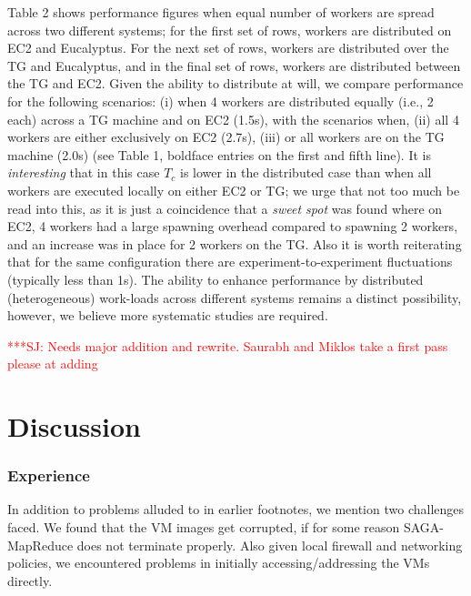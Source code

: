 \documentclass[3p,twocolumn]{elsarticle}
\newcommand{\jhanote}[1]{ {\textcolor{red} { ***SJ: #1 }}}
\newcommand{\jhanote}[1]{}
\newcommand{\sagamapreduce }{SAGA-MapReduce }
\begin{document}
Table 2 shows performance figures when equal number of workers are
spread across two different systems; for the first set of rows,
workers are distributed on EC2 and Eucalyptus. For the next set of
rows, workers are distributed over the TG and Eucalyptus, and in the
final set of rows, workers are distributed between the TG and EC2.
Given the ability to distribute at will, we compare performance for
the following scenarios: (i) when 4 workers are distributed equally
(i.e., 2 each) across a TG machine and on EC2 (1.5s), with the
scenarios when, (ii) all 4 workers are either exclusively on EC2
(2.7s), (iii) or all workers are on the TG machine (2.0s) (see Table
1, boldface entries on the first and fifth line). It is {\it
  interesting} that in this case $T_c$ is lower in the distributed
case than when all workers are executed locally on either EC2 or TG;
we urge that not too much be read into this, as it is just a
coincidence that a {\it sweet spot} was found where on EC2, 4 workers
had a large spawning overhead compared to spawning 2 workers, and an
increase was in place for 2 workers on the TG. Also it is worth
reiterating that for the same configuration there are
experiment-to-experiment fluctuations (typically less than 1s).  The
ability to enhance performance by distributed (heterogeneous)
work-loads across different systems remains a distinct possibility,
however, we believe more systematic studies are required.


\jhanote{Needs major addition and rewrite. Saurabh and Miklos take a
  first pass please at adding}


\section{Discussion}

\subsubsection*{Experience}

In addition to problems alluded to in earlier footnotes, we mention
two challenges  faced. We found that the VM images get corrupted, if for
some reason \sagamapreduce does not terminate properly. Also given
local firewall and networking policies, we encountered problems in
initially accessing/addressing the VMs directly.
\end{document}
